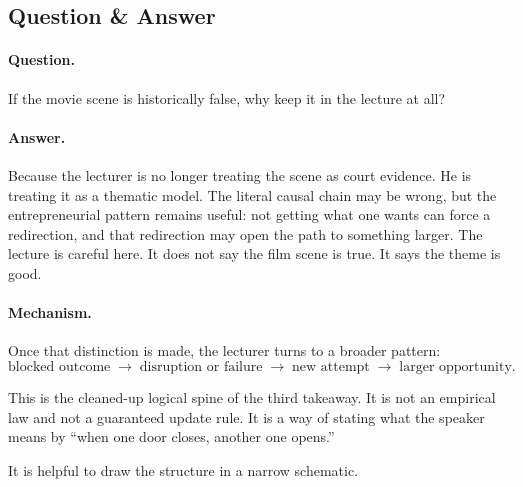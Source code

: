 \subsection{Question \& Answer}

\paragraph{Question.}
If the movie scene is historically false, why keep it in the lecture at all?

\paragraph{Answer.}
Because the lecturer is no longer treating the scene as court evidence. He is treating it as a thematic model. The literal causal chain may be wrong, but the entrepreneurial pattern remains useful: not getting what one wants can force a redirection, and that redirection may open the path to something larger. The lecture is careful here. It does not say the film scene is true. It says the theme is good.

\paragraph{Mechanism.}
Once that distinction is made, the lecturer turns to a broader pattern:
\begin{equation}
\text{blocked outcome}
\;\longrightarrow\;
\text{disruption or failure}
\;\longrightarrow\;
\text{new attempt}
\;\longrightarrow\;
\text{larger opportunity}.
\end{equation}

This is the cleaned-up logical spine of the third takeaway. It is not an empirical law and not a guaranteed update rule. It is a way of stating what the speaker means by ``when one door closes, another one opens.''

It is helpful to draw the structure in a narrow schematic.

\begin{figure}
\centering
{}
\end{figure}


